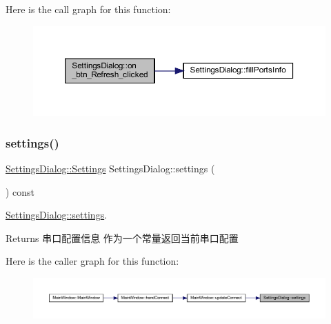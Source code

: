 Here is the call graph for this function\+:
\nopagebreak
\begin{figure}[H]
\begin{center}
\leavevmode
\includegraphics[width=350pt]{class_settings_dialog_a216e718d94b9766dbce166b37ebdc87b_cgraph}
\end{center}
\end{figure}
\mbox{\label{class_settings_dialog_aaffeca2603f381c3b7db7c8c934599fb}} 
\subsubsection{\texorpdfstring{settings()}{settings()}}
{\footnotesize\ttfamily \mbox{\hyperlink{struct_settings_dialog_1_1_settings}{Settings\+Dialog\+::\+Settings}} Settings\+Dialog\+::settings (\begin{DoxyParamCaption}{ }\end{DoxyParamCaption}) const}



\mbox{\hyperlink{class_settings_dialog_aaffeca2603f381c3b7db7c8c934599fb}{Settings\+Dialog\+::settings}}. 

\begin{DoxyReturn}{Returns}
串口配置信息 作为一个常量返回当前串口配置 
\end{DoxyReturn}
Here is the caller graph for this function\+:
\nopagebreak
\begin{figure}[H]
\begin{center}
\leavevmode
\includegraphics[width=350pt]{class_settings_dialog_aaffeca2603f381c3b7db7c8c934599fb_icgraph}
\end{center}
\end{figure}
\mbox{\label{class_settings_dialog_a70f6f67b5f5e3af21d011fa90c2b2098}} 
